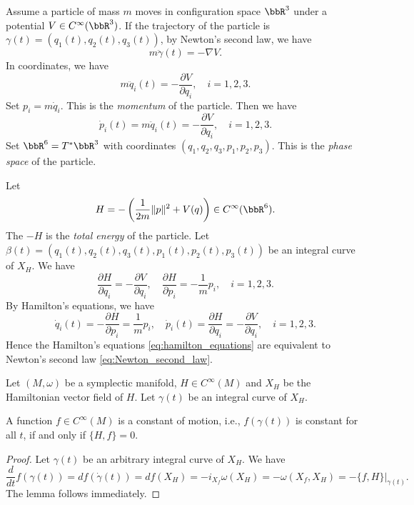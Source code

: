   \begin{example}
    Assume a particle of mass $m$ moves in configuration space $\bbR^3$ under a potential $V \in C^\infty(\bbR^3)$.
    If the trajectory of the particle is $\gamma(t) = (q_1(t), q_2(t), q_3(t))$, by Newton's second law, we have
    \[ m \ddot{\gamma}(t) = -\nabla V. \]
    In coordinates, we have
    \[ m \ddot{q}_i(t) = -\frac{\partial V}{\partial q_i}, \quad i = 1,2,3. \]
    Set $p_i = m \dot{q}_i$.
    This is the \emph{momentum} of the particle.
    Then we have
    \begin{equation}\label{eq:Newton_second_law}
      \dot{p}_i(t) = m \ddot{q}_i(t) = -\frac{\partial V}{\partial q_i}, \quad i = 1,2,3.
    \end{equation}  
    Set $\bbR^6 = T^*\bbR^3$ with coordinates $(q_1, q_2, q_3, p_1, p_2, p_3)$.
    This is the \emph{phase space} of the particle.

    Let 
    \[ H = -\left( \frac{1}{2m} \|p\|^2 + V(q) \right) \in C^\infty(\bbR^6). \]
    The $-H$ is the \emph{total energy} of the particle.
    Let $\beta(t) = (q_1(t), q_2(t), q_3(t), p_1(t), p_2(t), p_3(t))$ be an integral curve of $X_H$.
    We have 
    \[ \frac{\partial H}{\partial q_i} = -\frac{\partial V}{\partial q_i}, \quad \frac{\partial H}{\partial p_i} = -\frac{1}{m} p_i, \quad i = 1,2,3. \]
    By Hamilton's equations, we have
    \begin{equation}\label{eq:hamilton_equations}
      \dot{q}_i(t) = -\frac{\partial H}{\partial p_i} = \frac{1}{m} p_i, \quad \dot{p}_i(t) = \frac{\partial H}{\partial q_i} = -\frac{\partial V}{\partial q_i}, \quad i = 1,2,3.
    \end{equation}
    Hence the Hamilton's equations \eqref{eq:hamilton_equations} are equivalent to Newton's second law \eqref{eq:Newton_second_law}.
  \end{example}

  Let $(M,\omega)$ be a symplectic manifold, $H \in C^\infty(M)$ and $X_H$ be the Hamiltonian vector field of $H$.
  Let $\gamma(t)$ be an integral curve of $X_H$.
  
  \begin{lemma}
    A function $f \in C^\infty(M)$ is a constant of motion, i.e., $f(\gamma(t))$ is constant for all $t$, if and only if $\{H,f\} = 0$.
  \end{lemma}
  \begin{proof}
    Let $\gamma(t)$ be an arbitrary integral curve of $X_H$.
    We have
    \[ \frac{d}{dt} f(\gamma(t)) = df(\dot{\gamma}(t)) = df(X_H) = -i_{X_f} \omega(X_H) = -\omega(X_f, X_H) = -\{f,H\}|_{\gamma(t)}. \]
    The lemma follows immediately.
  \end{proof}

